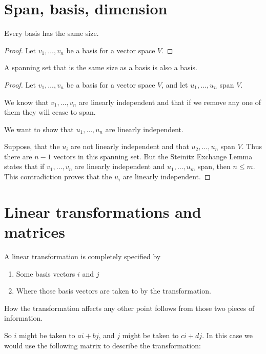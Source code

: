 \section{Span, basis, dimension}
\begin{theorem}
  Every basis has the same size.
\end{theorem}

\begin{proof} Let $v_1, \ldots, v_n$ be a basis for a vector space $V$.


\end{proof}

\begin{theorem}
  A spanning set that is the same size as a basis is also a basis.
\end{theorem}

\begin{proof}
  Let $v_1, \ldots, v_n$ be a basis for a vector space $V$, and let
  $u_1, \ldots, u_n$ span $V$.

  We know that $v_1, \ldots, v_n$ are linearly independent and that if we
  remove any one of them they will cease to span.

  We want to show that $u_1, \ldots, u_n$ are linearly independent.

  Suppose, that the $u_i$ are not linearly independent and that
  $u_2, \ldots, u_n$ span $V$. Thus there are $n-1$ vectors in this spanning
  set. But the Steinitz Exchange Lemma states that if $v_1, \ldots, v_n$ are
  linearly independent and $u_1, \ldots, u_m$ span, then $n \leq m$. This
  contradiction proves that the $u_i$ are linearly independent.
\end{proof}
\section{Linear transformations and matrices}

A linear transformation is completely specified by

\begin{enumerate}
\item Some basis vectors $i$ and $j$
\item Where those basis vectors are taken to by the transformation.
\end{enumerate}

How the transformation affects any other point follows from those two pieces of
information.

So $i$ might be taken to $ai + bj$, and $j$ might be taken to $ci + dj$.
In this case we would use the following matrix to describe the
transformation:

